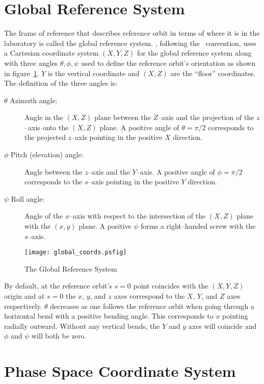 \section{Global Reference System}

The frame of reference that describes reference orbit in terms of where it
is in the laboratory is called the global reference system.
\bmad, following the \mad\ convention, uses a Cartesian coordinate system
$(X, Y, Z)$ for the global reference system along with three angles
$\theta, \phi, \psi$ used to define the reference orbit's orientation
as shown in figure~\ref{f:global_coords}. $Y$ is the vertical
coordinate and $(X, Z)$ are the ``floor'' coordinates.  The definition
of the three angles is:
\begin{description}
\item[$\theta$ Azimuth angle:] Angle in the $(X, Z)$ plane 
between the $Z$--axis and the projection of the $z$--axis onto the
$(X, Z)$ plane. A positive angle of $\theta = \pi/2$ corresponds to the
projected $z$--axis pointing in the positive $X$ direction.
\item[$\phi$ Pitch (elevation) angle:] Angle between the $z$--axis 
and the $Y$--axis. A positive angle of $\phi = \pi/2$ corresponds to
the $s$--axis pointing in the positive $Y$ direction.
\item[$\psi$ Roll angle:] Angle of the $x$--axis with respect 
to the intersection of the $(X, Z)$ plane with the $(x, y)$ plane. A
positive $\psi$ forms a right--handed screw with the $s$--axis.
\end{description}

\begin{figure}
\centering
\texttt{[image: global\_coords.psfig]}
\caption{The Global Reference System}
\label{f:global_coords}
\end{figure}

By default, at the reference orbit's $s = 0$ point coincides with the
$(X, Y, Z)$ origin and at $s = 0$ the $x$, $y$, and $z$ axes
correspond to the $X$, $Y$, and $Z$ axes respectively. $\theta$
decreases as one follows the reference orbit when going through a
horizontal bend with a positive bending angle. This corresponds to $x$
pointing radially outward. Without any vertical bends, the $Y$ and $y$
axes will coincide and $\phi$ and $\psi$ will both be zero.

\section{Phase Space Coordinate System}

